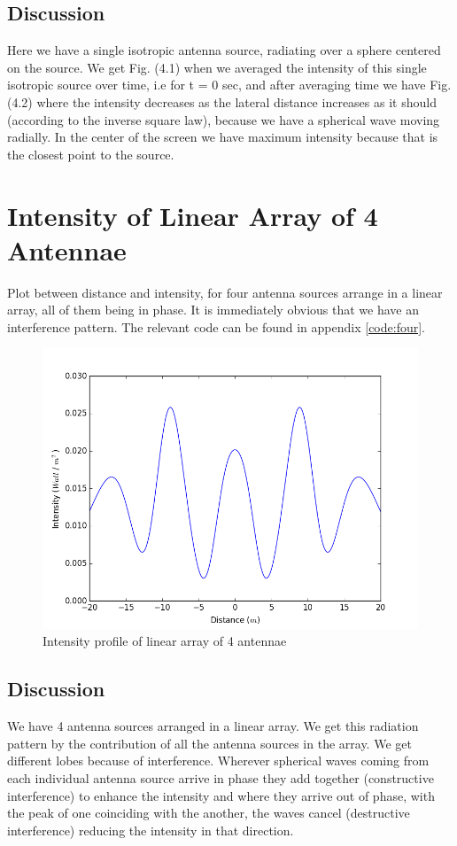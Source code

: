 \subsection{Discussion}

Here we have a single isotropic antenna source, radiating over a sphere centered on the source. We get Fig. (4.1) when we averaged the intensity of this single isotropic source over time, i.e for t = 0 sec, and after averaging time we have Fig. (4.2) where the intensity decreases as the lateral distance increases as it should (according to the inverse square law), because we have a spherical wave moving radially. In the center of the screen we have maximum intensity because that is the closest point to the source. 


\section{Intensity of Linear Array of 4 Antennae}

Plot between distance and intensity, for four antenna sources arrange in a linear array, all of them being in phase. It is immediately obvious that we have an interference pattern. The relevant code can be found in appendix \ref{code:four}.

\begin{figure}[!h]
	\centering	
    \includegraphics[scale=0.45]{figure_3.png}
	\caption{Intensity profile of linear array of 4 antennae}
\end{figure}

\subsection{Discussion}
We have 4 antenna sources arranged in a linear array. We get this radiation pattern by the contribution of all the antenna sources in the array. We get different lobes because of interference. Wherever spherical waves coming from each individual antenna source arrive in phase they add together (constructive interference) to enhance the intensity and where they arrive out of phase, with the peak of one coinciding with the another, the waves cancel (destructive interference) reducing the intensity in that direction.

